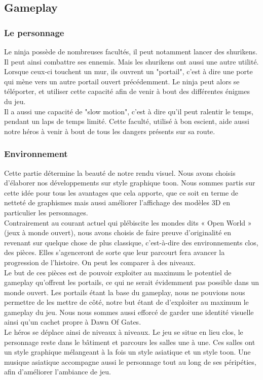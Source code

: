 \documentclass[12pt]{article}
\begin{document}
\subsection{Gameplay}

\subsubsection{Le personnage}

Le ninja possède de nombreuses facultés, il peut notamment lancer des shurikens. Il peut ainsi combattre ses ennemis. Mais les shurikens ont aussi une autre utilité. Lorsque ceux-ci touchent un mur, ils ouvrent un "portail", c'est à dire une porte qui mène vers un autre portail ouvert précédemment. Le ninja peut alors se téléporter, et utiliser cette capacité afin de venir à bout des différentes énigmes du jeu.\\
Il a aussi une capacité de "slow motion", c'est à dire qu'il peut ralentir le temps, pendant un laps de temps limité. Cette faculté, utilisé à bon escient, aide aussi notre héros à venir à bout de tous les dangers présents sur sa route.\\

\subsubsection{Environnement}

Cette partie détermine la beauté de notre rendu visuel. Nous avons choisis d'élaborer nos développements sur style graphique toon. Nous sommes partis sur cette idée pour tous les avantages que cela apporte, que ce soit en terme de netteté de graphismes mais aussi améliorer l'affichage des modèles 3D en particulier les personnages.\\
Contrairement au courant actuel qui plébiscite les mondes dits « Open World » (jeux à monde ouvert), nous avons choisis de faire preuve d'originalité en revenant sur quelque chose de plus classique, c'est-à-dire des environnements clos, des pièces. Elles s'agenceront de sorte que leur parcourt fera avancer la progression de l'histoire. On peut les comparer à des niveaux.\\
Le but de ces pièces est de pouvoir exploiter au maximum le potentiel de gameplay qu'offrent les portails, ce qui ne serait évidemment pas possible dans un monde ouvert. Les portails étant la base du gameplay, nous ne pouvions nous permettre de les mettre de côté, notre but étant de d'exploiter au maximum le gameplay du jeu. Nous nous sommes aussi efforcé de garder une identité visuelle ainsi qu'un cachet propre à Dawn Of Gates.\\
Le héros se déplace ainsi de niveaux à niveaux. Le jeu se situe en lieu clos, le personnage reste dans le bâtiment et parcours les salles une à une. Ces salles ont un style graphique mélangeant à la fois un style asiatique et un style toon. Une musique asiatique accompagne aussi le personnage tout au long de ses péripéties, afin d'améliorer l'ambiance de jeu.
\end{document}

